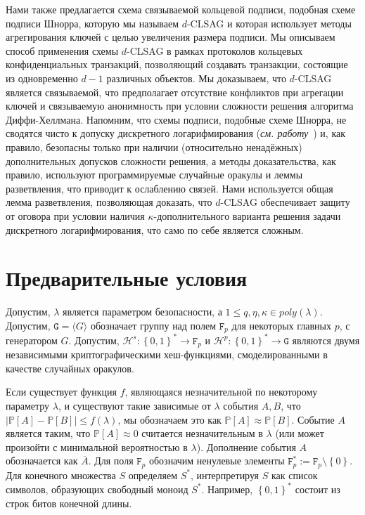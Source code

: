 \documentclass{llncs}
\newcommand{\F}{\texttt{F}_p}
\newcommand{\G}{\texttt{G}}
\newcommand{\Hp}{\mathcal{H}^p}
\newcommand{\Hs}{\mathcal{H}^s}
\newcommand{\prob}{\mathbb{P}}
\begin{document}
Нами также предлагается схема связываемой кольцевой подписи, подобная схеме подписи Шнорра, которую мы называем $d$-CLSAG и которая использует методы агрегирования ключей с целью увеличения размера подписи. Мы описываем способ применения схемы $d$-CLSAG в рамках протоколов кольцевых конфиденциальных транзакций, позволяющий создавать транзакции, состоящие из одновременно $d-1$ различных объектов. Мы доказываем, что $d$-CLSAG является связываемой, что предполагает отсутствие конфликтов при агрегации ключей и связываемую анонимность при условии сложности решения алгоритма Диффи-Хеллмана. Напомним, что схемы подписи, подобные схеме Шнорра, не сводятся чисто к допуску дискретного логарифмирования (\textit{см. работу}\ \cite{paillier2005discrete}) и, как правило, безопасны только при наличии (относительно ненадёжных) дополнительных допусков сложности решения, а методы доказательства, как правило, используют программируемые случайные оракулы и леммы разветвления, что приводит к ослаблению связей. Нами используется общая лемма разветвления, позволяющая доказать, что $d$-CLSAG обеспечивает защиту от оговора при условии наличия $\kappa$-дополнительного варианта решения задачи дискретного логарифмирования, что само по себе является сложным.


\section{Предварительные условия}

Допустим, $\lambda$ является параметром безопасности, а $1 \leq q, \eta, \kappa \in poly(\lambda)$. Допустим, $\G = \langle G \rangle$ обозначает группу над полем $\F$ для некоторых главных $p$, с генератором $G$. Допустим, $\Hs:\left\{0,1\right\}^* \to \F$ и $\Hp:\left\{0,1\right\}^* \to \G$ являются двумя независимыми криптографическими хеш-функциями, смоделированными в качестве случайных оракулов.

Если существует функция $f$, являющаяся незначительной по некоторому параметру $\lambda$, и существуют такие зависимые от $\lambda$ события $A, B$, что $\left|\prob\left[A\right] - \prob\left[B\right]\right| \leq f(\lambda)$, мы обозначаем это как $\prob\left[A\right] \approx \prob\left[B\right]$. Событие $A$ является таким, что $\prob\left[A\right] \approx 0$ считается незначительным в $\lambda$ (или может произойти с минимальной вероятностью в $\lambda$). Дополнение события $A$ обозначается как $\overline{A}$. Для поля $\F$ обозначим ненулевые элементы $\F^* := \F\setminus \left\{0\right\}$. Для конечного множества $S$ определяем $S^*$, интерпретируя $S$ как список символов, образующих свободный моноид $S^*$. Например, $\left\{0,1\right\}^*$ состоит из строк битов конечной длины.
\end{document}
